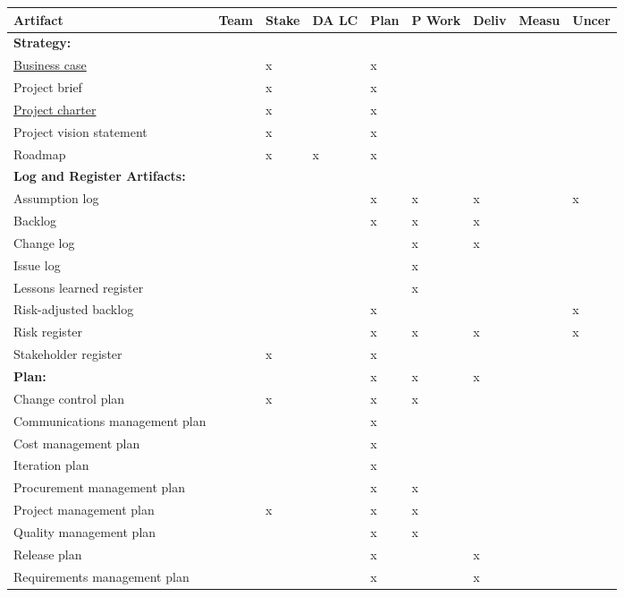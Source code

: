 \documentclass[11pt]{article}
\begin{document}
\label{artifacts_mapping}
\begin{center}
\begin{tabular}{lllllllll}
Artifact & Team\footnotemark & Stake\footnotemark & DA LC \footnotemark & Plan\footnotemark & P Work\footnotemark & Deliv\footnotemark & Measu\footnotemark & Uncer\footnotemark\\
\hline
\textbf{Strategy:} &  &  &  &  &  &  &  & \\
\hline
\label{business_case}  \href{./Strategy/business\_case.org}{Business case} &  & x &  & x &  &  &  & \\
Project brief &  & x &  & x &  &  &  & \\
\href{./Strategy/project\_charter.org}{Project charter} &  & x &  & x &  &  &  & \\
Project vision statement &  & x &  & x &  &  &  & \\
Roadmap &  & x & x & x &  &  &  & \\
\textbf{Log and Register Artifacts:} &  &  &  &  &  &  &  & \\
Assumption log &  &  &  & x & x & x &  & x\\
Backlog &  &  &  & x & x & x &  & \\
Change log &  &  &  &  & x & x &  & \\
Issue log &  &  &  &  & x &  &  & \\
Lessons learned register &  &  &  &  & x &  &  & \\
Risk-adjusted backlog &  &  &  & x &  &  &  & x\\
Risk register &  &  &  & x & x & x &  & x\\
Stakeholder register &  & x &  & x &  &  &  & \\
\hline
\textbf{Plan:} &  &  &  & x & x & x &  & \\
\hline
Change control plan &  & x &  & x & x &  &  & \\
Communications management plan &  &  &  & x &  &  &  & \\
Cost management plan &  &  &  & x &  &  &  & \\
Iteration plan &  &  &  & x &  &  &  & \\
Procurement management plan &  &  &  & x & x &  &  & \\
Project management plan &  & x &  & x & x &  &  & \\
Quality management plan &  &  &  & x & x &  &  & \\
Release plan &  &  &  & x &  & x &  & \\
Requirements management plan &  &  &  & x &  & x &  & \\

\end{tabular}
\end{center}
\end{document}
